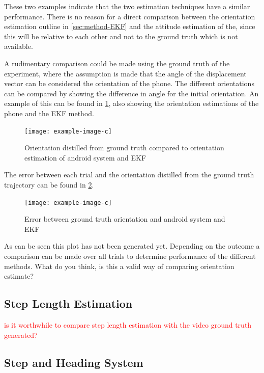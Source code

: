 These two examples indicate that the two estimation techniques have a similar performance. There is no reason for a direct comparison between the orientation estimation outline in \cref{sec:method-EKF} and the attitude estimation of the, since this will be relative to each other and not to the ground truth which is not available. 

A rudimentary comparison could be made using the ground truth of the experiment, where the assumption is made that the angle of the displacement vector can be considered the orientation of the phone. The different orientations can be compared by showing the difference in angle for the initial orientation. An example of this can be found in \cref{fig:orientation_comparison}, also showing the orientation estimations of the phone and the EKF method.

\begin{figure}[H]
	\centering
	\texttt{[image: example-image-c]}
	\caption{Orientation distilled from ground truth compared to orientation estimation of android system and EKF}
	\label{fig:orientation_comparison}
\end{figure}

The error between each trial and the orientation distilled from the ground truth trajectory can be found in \cref{fig:orientation_error_comparison}.

\begin{figure}[H]
	\centering
	\texttt{[image: example-image-c]}
	\caption{Error between ground truth orientation and android system and EKF}
	\label{fig:orientation_error_comparison}
\end{figure}


{\color{red}As can be seen this plot has not been generated yet. Depending on the outcome a comparison can be made over all trials to determine performance of the different methods. What do you think, is this a valid way of comparing orientation estimate?}


\subsection{Step Length Estimation}

\textcolor{red}{is it worthwhile to compare step length estimation with the video ground truth generated?}

\subsection{Step and Heading System}


